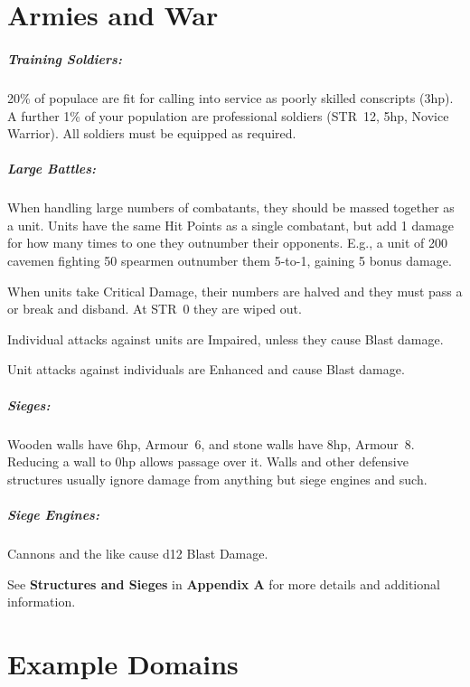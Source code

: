 \documentclass[itdr]{subfiles}
\begin{document}
\vfill

\section{Armies and War}


\subparagraph{Training Soldiers:} 20\% of populace are fit for calling into service as poorly skilled conscripts (3hp). A further 1\% of your population are professional soldiers (STR~12, 5hp, Novice Warrior). All soldiers must be equipped as required.

\subparagraph{Large Battles:} When handling large numbers of combatants, they should be massed together as a unit. Units have the same Hit Points as a single combatant, but add 1 damage for how many times to one they outnumber their opponents. E.g., a unit of 200 cavemen fighting 50 spearmen outnumber them \mbox{5-to-1}, gaining 5 bonus damage.

When units take Critical Damage, their numbers are halved and they must pass a  or break and disband. At STR~0 they are wiped out.

Individual attacks against units are Impaired, unless they cause Blast damage.

Unit attacks against individuals are Enhanced and cause Blast damage.

\subparagraph{Sieges:} Wooden walls have 6hp, Armour~6, and stone walls have 8hp, Armour~8. Reducing a wall to 0hp allows passage over it. Walls and other defensive structures usually ignore damage from anything but siege engines and such.

\subparagraph{Siege Engines:} Cannons and the like cause d12 Blast Damage.

\vspace{-0.2em}
\begin{dbox}
	See \textbf{Structures and Sieges} in \textbf{Appendix A} for more details and additional information.
\end{dbox}

\vfill

\section{Example Domains}
\end{document}
